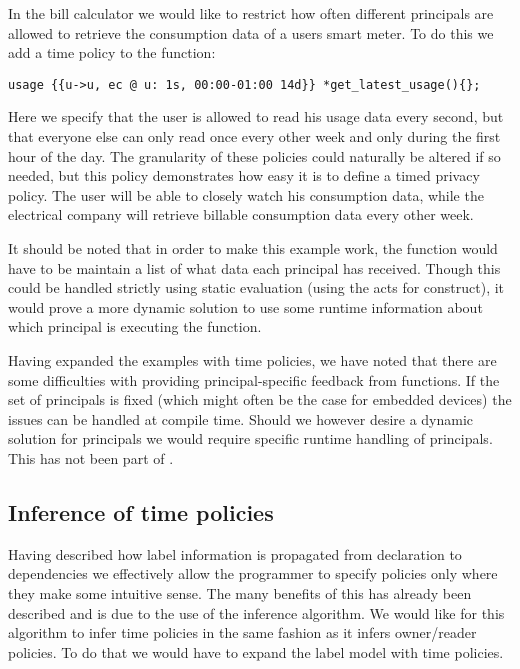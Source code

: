 In the bill calculator we would like to restrict how often different principals are allowed to retrieve the consumption data of a users smart meter.
To do this we add a time policy to the  function:

\begin{lstlisting}[style=dlmc]
  usage {{u->u, ec @ u: 1s, 00:00-01:00 14d}} *get_latest_usage(){};
\end{lstlisting}

Here we specify that the user is allowed to read his usage data every second, but that everyone else can only read once every other week and only during the first hour of the day.
The granularity of these policies could naturally be altered if so needed, but this policy demonstrates how easy it is to define a timed privacy policy.
The user will be able to closely watch his consumption data, while the electrical company will retrieve billable consumption data every other week.

It should be noted that in order to make this example work, the  function would have to be maintain a list of what data each principal has received.
Though this could be handled strictly using static evaluation (using the acts for construct), it would prove a more dynamic solution to use some runtime information about which principal is executing the function.

Having expanded the examples with time policies, we have noted that there are some difficulties with providing principal-specific feedback from functions.
If the set of principals is fixed (which might often be the case for embedded devices) the issues can be handled at compile time.
Should we however desire a dynamic solution for principals we would require specific runtime handling of principals.
This has not been part of \thelang{}.

\subsection{Inference of time policies}\label{time:inference}
Having described how label information is propagated from declaration to dependencies we effectively allow the programmer to specify policies only where they make some intuitive sense.
The many benefits of this has already been described and is due to the use of the inference algorithm.
We would like for this algorithm to infer time policies in the same fashion as it infers owner/reader policies.
To do that we would have to expand the label model with time policies.

